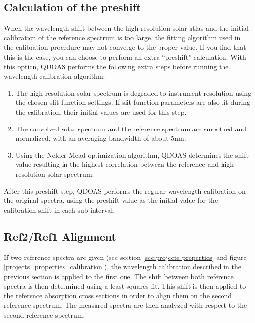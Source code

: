 \subsection{Calculation of the preshift}
When the wavelength shift between the high-resolution solar atlas and
the initial calibration of the reference spectrum is too large, the
fitting algorithm used in the calibration procedure may not converge
to the proper value.  If you find that this is the case, you can
choose to perform an extra ``preshift'' calculation.  With this
option, QDOAS performs the following extra steps before running the
wavelength calibration algorithm:

\begin{enumerate}
\item The high-resolution solar spectrum is degraded to instrument
  resolution using the chosen slit function settings.  If slit
  function parameters are also fit during the calibration, their
  initial values are used for this step.
\item The convolved solar spectrum and the reference spectrum are
  smoothed and normalized, with an averaging bandwidth of about 5nm.
\item Using the Nelder-Mead optimization algorithm, QDOAS determines
  the shift value resulting in the highest correlation between the
  reference and high-resolution solar spectrum.
\end{enumerate}

After this preshift step, QDOAS performs the regular wavelength
calibration on the original spectra, using the preshift value as the
initial value for the calibration shift in each sub-interval.

\subsection{Ref2/Ref1 Alignment}\label{sec:ref2ref1-alignment}
If two reference spectra are given (see section
\ref{sec:projects-properties} and figure
\ref{projects_properties_calibration}), the wavelength calibration
described in the previous section is applied to the first one.  The
shift between both reference spectra is then determined using a least
squares fit.  This shift is then applied to the reference absorption
cross sections in order to align them on the second reference
spectrum.  The measured spectra are then analyzed with respect to the
second reference spectrum.

%


